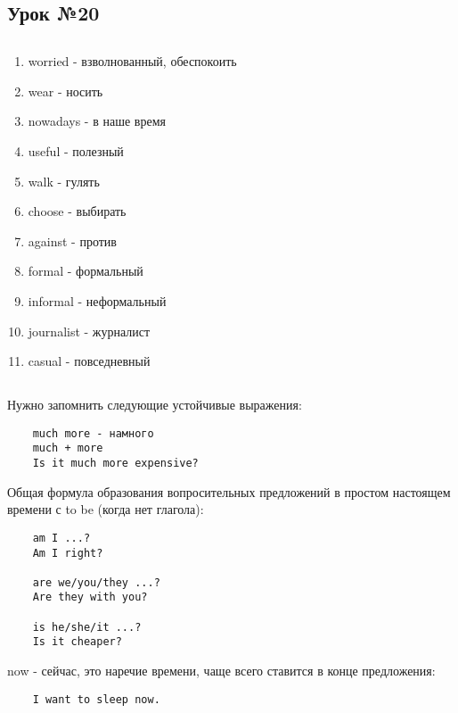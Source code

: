 \subsection{Урок №20}

\subsection*{}
\begin{multicols}{2}
    \begin{enumerate}\setlength{\itemsep}{0pt}
        \item worried - взволнованный, обеспокоить
        \item wear - носить
        \item nowadays - в наше время
        \item useful - полезный
        \item walk - гулять
        \item choose - выбирать
        \item against - против
        \item formal - формальный
        \item informal - неформальный
        \item journalist - журналист
        \item casual - повседневный
    \end{enumerate}
\end{multicols}

\subsection*{}
Нужно запомнить следующие устойчивые выражения:
\begin{verbatim}
    much more - намного
    much + more
    Is it much more expensive?
\end{verbatim}

Общая формула образования вопросительных предложений в простом настоящем времени с to be (когда нет глагола):
\begin{verbatim}
    am I ...?
    Am I right?

    are we/you/they ...?
    Are they with you?

    is he/she/it ...?
    Is it cheaper?
\end{verbatim}

now - сейчас, это наречие времени, чаще всего ставится в конце предложения:
\begin{verbatim}
    I want to sleep now.
\end{verbatim}